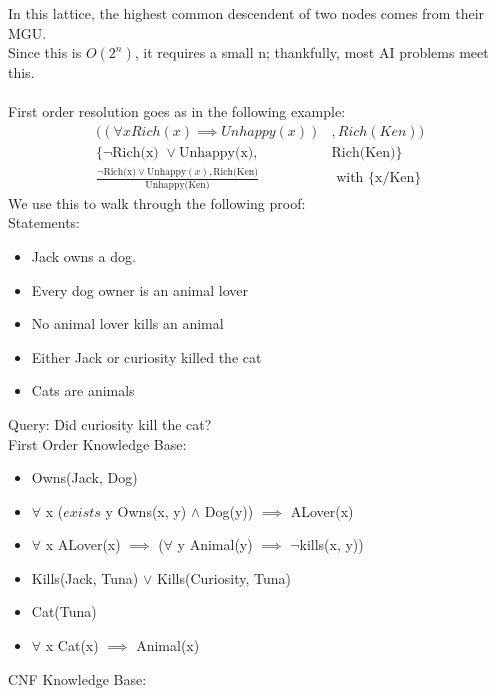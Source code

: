 \documentclass[../../lecture_notes.tex]{subfiles}
\begin{document}
In this lattice, the highest common descendent of two nodes comes from their MGU.\\
Since this is $O(2^n)$, it requires a small n; thankfully, most AI problems meet this.\\
\\
First order resolution goes as in the following example:\begin{align*}
	((\forall x Rich(x) \implies Unhappy(x))&, Rich(Ken))\\
	\{\neg \text{Rich(x) } \lor \text{Unhappy(x)}, &\text{Rich(Ken)}\}\\
	\frac{\neg\text{Rich(x)} \lor \text{Unhappy}(x), \text{Rich(Ken)}} {\text{Unhappy(Ken)}}& \text{ with \{x/Ken\}}
\end{align*}
We use this to walk through the following proof:\\
	\indent Statements:
		\begin{itemize} [itemsep=0mm]
			\item Jack owns a dog.
			\item Every dog owner is an animal lover
			\item No animal lover kills an animal
			\item Either Jack or curiosity killed the cat
			\item Cats are animals
		\end{itemize}
	\indent Query: Did curiosity kill the cat?\\
	\indent First Order Knowledge Base:
		\begin{itemize} [itemsep=0mm]
			\item Owns(Jack, Dog)
			\item $\forall$ x ($exists$ y Owns(x, y) $\land$ Dog(y)) $\implies$ ALover(x)
			\item $\forall$ x ALover(x) $\implies$ ($\forall$ y Animal(y) $\implies$ $\neg$kills(x, y))
			\item Kills(Jack, Tuna) $\lor$ Kills(Curiosity, Tuna)
			\item Cat(Tuna)
			\item $\forall$ x Cat(x) $\implies$ Animal(x)
		\end{itemize}
	\indent CNF Knowledge Base:
\end{document}
